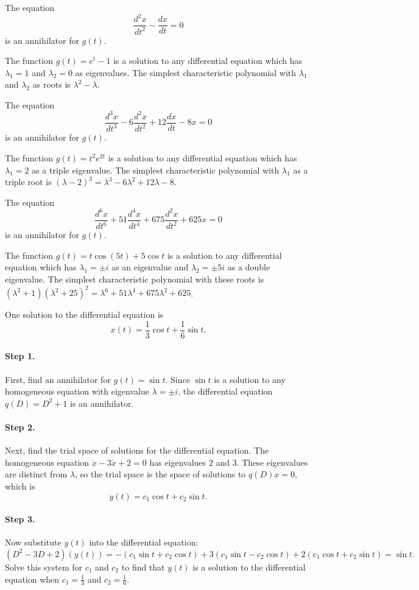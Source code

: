 \documentclass{ximera}
\begin{document}
 \ans The equation
\[
\frac{d^2x}{dt^2} - \frac{dx}{dt} = 0
\]
is an annihilator for $g(t)$.

\soln The function $g(t) = e^t - 1$ is a solution to any differential equation
which has $\lambda_1 = 1$ and $\lambda_2 = 0$ as eigenvalues.  The
simplest characteristic polynomial with $\lambda_1$ and $\lambda_2$ as
roots is $\lambda^2 - \lambda$.

 \ans The equation
\[
\frac{d^3x}{dt^3} - 6\frac{d^2x}{dt^2} + 12\frac{dx}{dt} - 8x = 0
\]
is an annihilator for $g(t)$.

\soln The function $g(t) = t^2e^{2t}$ is a solution to any differential
equation which has $\lambda_1 = 2$ as a triple eigenvalue.  The simplest
characteristic polynomial with $\lambda_1$ as a triple root is
$(\lambda - 2)^3 = \lambda^3 - 6\lambda^2 + 12\lambda - 8$.

 \ans The equation
\[
\frac{d^6x}{dt^6} + 51\frac{d^4x}{dt^4} + 675\frac{d^2x}{dt^2} + 625x = 0
\]
is an annihilator for $g(t)$.

\soln The function $g(t) = t\cos(5t) + 5\cos t$ is a solution to any
differential equation which has $\lambda_1 = \pm i$ as an eigenvalue and
$\lambda_2 = \pm 5i$ as a double eigenvalue.  The simplest characteristic
polynomial with these roots is
$(\lambda^2 + 1)(\lambda^2 + 25)^2 = \lambda^6 + 51\lambda^4 + 675\lambda^2
+ 625$.

 \ans One solution to the differential equation is
\[
x(t) = \frac{1}{3}\cos t + \frac{1}{6}\sin t.
\]

\soln
\paragraph{Step 1.} First, find an annihilator for $g(t) = \sin t$.  Since
$\sin t$ is a solution to any homogeneous equation with eigenvalue
$\lambda = \pm i$, the differential equation $q(D) = D^2 + 1$ is an
annihilator.

\paragraph{Step 2.} Next, find the trial space of solutions for the
differential equation.  The homogeneous equation $\ddot{x} - 3\dot{x}
+ 2 = 0$ has eigenvalues $2$ and $3$.  These eigenvalues are distinct
from $\lambda$, so the trial space is the space of solutions to $q(D)x
= 0$, which is
\[
y(t) = c_1\cos t + c_2\sin t.
\]
\paragraph{Step 3.} Now substitute $y(t)$ into the differential equation:
\[
(D^2 - 3D + 2)(y(t)) = -(c_1\sin t + c_2\cos t) + 3(c_1\sin t - c_2\cos t)
+ 2(c_1\cos t + c_2\sin t) = \sin t.
\]
Solve this system for $c_1$ and $c_2$ to find that $y(t)$ is a solution to
the differential equation when $c_1 = \frac{1}{3}$ and $c_2 = \frac{1}{6}$.
\end{document}
